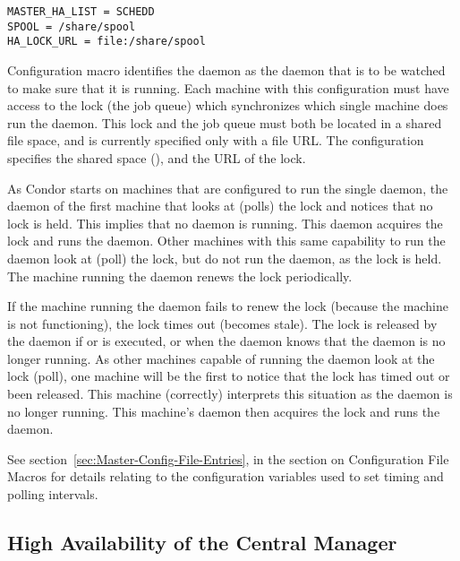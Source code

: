 \begin{verbatim}
MASTER_HA_LIST = SCHEDD
SPOOL = /share/spool
HA_LOCK_URL = file:/share/spool
\end{verbatim}

Configuration macro  identifies the 
 daemon as the daemon that is to be watched
to make sure that it is running.
Each machine with this configuration must have access to the
lock (the job queue) which synchronizes which single machine does run the
 daemon.
This lock and the job queue must both be located in a shared file space,
and is currently specified only with a file URL.
The configuration specifies the shared space
(),
and the URL of the lock.

As Condor starts on machines that are configured to run
the single  daemon, 
the  daemon of the
first machine that looks at (polls) the lock
and notices that no lock is held.
This implies that no  daemon is running.
This  daemon acquires the lock
and runs the  daemon.
Other machines with this same capability to run the
 daemon look at (poll) the lock, 
but do not run the daemon, as the lock is held.
The machine running the  daemon renews the
lock periodically.

If the machine running the  daemon fails to renew
the lock (because the machine is not functioning),
the lock times out (becomes stale).
The lock is released by the  daemon
if  or  is
executed, or when the  daemon knows that the
 daemon is no longer running.
As other machines capable of running the  daemon
look at the lock (poll), one machine will be the first
to notice that the lock has timed out or been released.
This machine (correctly) interprets this situation as the
 daemon is no longer running.
This machine's  daemon then acquires the lock
and runs the  daemon.

See 
section~\ref{sec:Master-Config-File-Entries},
in the section on  Configuration File Macros
for details relating to the configuration variables
used to set timing and polling intervals.

\subsection{\label{sec:HA-negotiator} High Availability of the
Central Manager} 

